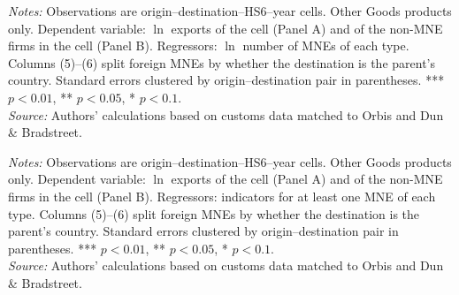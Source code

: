 \documentclass[11pt,a4paper]{article}
\begin{document}
\begin{table}[H]\centering\small%
  \caption{Other Goods: Multinational Presence and Exports: Intensive Margin, by Type of Multinational}%
  \label{tab:cnt_rest}%
  \par\vspace{3pt}%
  \begin{minipage}{0.95\textwidth}\footnotesize %
  \textit{Notes:} Observations are origin--destination--HS6--year cells. Other Goods products only. Dependent variable: $\ln$ exports of the cell (Panel A) and of the non-MNE firms in the cell (Panel B). Regressors: $\ln$ number of MNEs of each type. Columns (5)--(6) split foreign MNEs by whether the destination is the parent's country. Standard errors clustered by origin--destination pair in parentheses. *** $p<0.01$, ** $p<0.05$, * $p<0.1$.\\[3pt]%
  \textit{Source:} Authors' calculations based on customs data matched to Orbis and Dun \& Bradstreet.%
  \end{minipage}%
  \end{table}
\begin{table}[H]\centering\small%
  \caption{Other Goods: Multinational Presence and Exports: Extensive Margin, by Type of Multinational}%
  \label{tab:ext_rest}%
  \par\vspace{3pt}%
  \begin{minipage}{0.95\textwidth}\footnotesize %
  \textit{Notes:} Observations are origin--destination--HS6--year cells. Other Goods products only. Dependent variable: $\ln$ exports of the cell (Panel A) and of the non-MNE firms in the cell (Panel B). Regressors: indicators for at least one MNE of each type. Columns (5)--(6) split foreign MNEs by whether the destination is the parent's country. Standard errors clustered by origin--destination pair in parentheses. *** $p<0.01$, ** $p<0.05$, * $p<0.1$.\\[3pt]%
  \textit{Source:} Authors' calculations based on customs data matched to Orbis and Dun \& Bradstreet.%
  \end{minipage}%
  \end{table}
\end{document}
